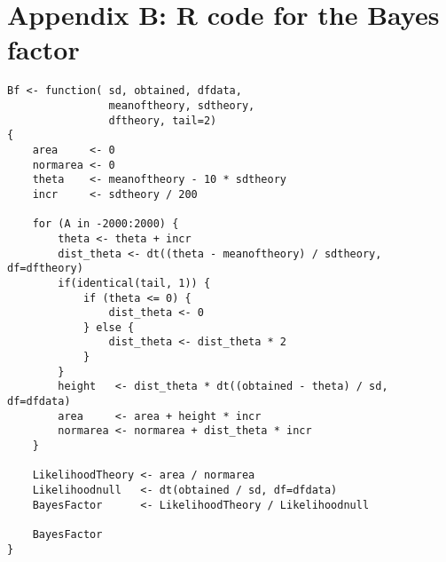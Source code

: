 \section*{Appendix B: R code for the Bayes factor}

\begin{verbatim}
Bf <- function( sd, obtained, dfdata, 
                meanoftheory, sdtheory,
                dftheory, tail=2)
{           
    area     <- 0
    normarea <- 0
    theta    <- meanoftheory - 10 * sdtheory
    incr     <- sdtheory / 200

    for (A in -2000:2000) {
        theta <- theta + incr
        dist_theta <- dt((theta - meanoftheory) / sdtheory, df=dftheory)
        if(identical(tail, 1)) {
            if (theta <= 0) {
                dist_theta <- 0
            } else {
                dist_theta <- dist_theta * 2
            }
        }
        height   <- dist_theta * dt((obtained - theta) / sd, df=dfdata)
        area     <- area + height * incr
        normarea <- normarea + dist_theta * incr
    }

    LikelihoodTheory <- area / normarea
    Likelihoodnull   <- dt(obtained / sd, df=dfdata)
    BayesFactor      <- LikelihoodTheory / Likelihoodnull 

    BayesFactor
}
\end{verbatim}
